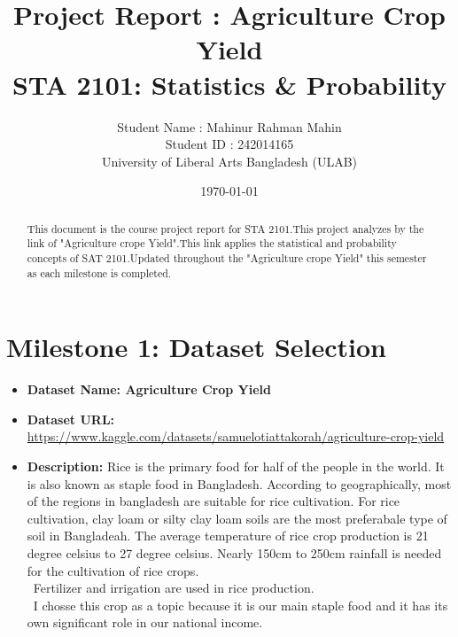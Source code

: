 \documentclass[12pt,a4paper]{article}
\title{\textbf{Project Report : Agriculture Crop Yield}\\
STA 2101: Statistics \& Probability}
\author{Student Name : Mahinur Rahman Mahin \\
Student ID : 242014165 \\
University of Liberal Arts Bangladesh (ULAB)}
\date{\today}
\begin{document}
\maketitle
\onehalfspacing

\begin{abstract}
This document is the course project report for STA 2101.This project analyzes by the link of "Agriculture crope Yield".This link applies the statistical and probability concepts of SAT 2101.Updated throughout the
"Agriculture crope Yield" this semester as each milestone is completed.
\end{abstract}

\tableofcontents
\newpage












\section{Milestone 1: Dataset Selection}
\begin{itemize}
    \item \textbf{Dataset Name: Agriculture Crop Yield} %
    \item \textbf{Dataset URL:} \\                \url{https://www.kaggle.com/datasets/samuelotiattakorah/agriculture-crop-yield}  
    \item \textbf{Description:} Rice is the primary food for half of the people in the world. It is also known as staple food in Bangladesh. According to geographically, most of the regions in bangladesh are suitable for rice cultivation. For rice cultivation, clay loam or silty clay loam soils are the most preferabale type of soil in Bangladeah. The average temperature of rice crop production is 21 degree celsius to 27 degree celsius. Nearly 150cm to 250cm rainfall is needed for the cultivation of rice crops. \\\
    Fertilizer and irrigation are used in rice production. \\\
    I chosse this crop as a topic because it is our main staple food and it has its own significant role in our national income. 
\end{itemize}
\end{document}
